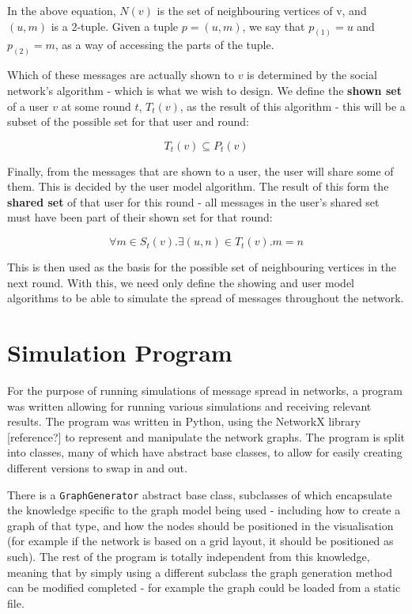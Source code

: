\documentclass[bsc,frontabs,twoside,singlespacing,parskip,deptreport]{infthesis}     %
\begin{document}
In the above equation, $N(v)$ is the set of neighbouring vertices of v, and $(u, m)$ is a 2-tuple. Given a tuple $p = (u, m)$, we say that $p_{(1)} = u$ and $p_{(2)} = m$, as a way of accessing the parts of the tuple.

Which of these messages are actually shown to $v$ is determined by the social network's algorithm - which is what we wish to design. We define the \textbf{shown set} of a user $v$ at some round $t$, $T_{t}(v)$, as the result of this algorithm - this will be a subset of the possible set for that user and round:

\begin{equation}
T_{t}(v) \subseteq P_{t}(v)
\end{equation}

Finally, from the messages that are shown to a user, the user will share some of them. This is decided by the user model algorithm. The result of this form the \textbf{shared set} of that user for this round - all messages in the user's shared set must have been part of their shown set for that round:

\begin{equation}
\forall m \in S_{t}(v) . \exists (u, n) \in T_{t}(v) . m = n
\end{equation}

This is then used as the basis for the possible set of neighbouring vertices in the next round. With this, we need only define the showing and user model algorithms to be able to simulate the spread of messages throughout the network.

\section{Simulation Program}
For the purpose of running simulations of message spread in networks, a program was written allowing for running various simulations and receiving relevant results. The program was written in Python, using the NetworkX library [reference?] to represent and manipulate the network graphs. The program is split into classes, many of which have abstract base classes, to allow for easily creating different versions to swap in and out.

There is a \texttt{GraphGenerator} abstract base class, subclasses of which encapsulate the knowledge specific to the graph model being used - including how to create a graph of that type, and how the nodes should be positioned in the visualisation (for example if the network is based on a grid layout, it should be positioned as such). The rest of the program is totally independent from this knowledge, meaning that by simply using a different subclass the graph generation method can be modified completed - for example the graph could be loaded from a static file.
\end{document}
